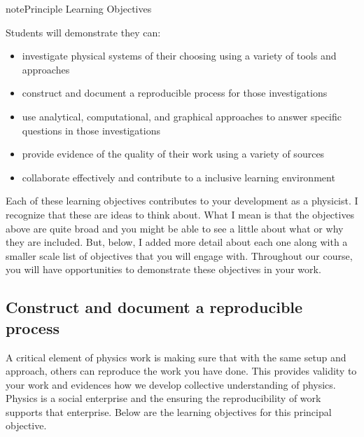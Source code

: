 \documentclass[letterpaper,10pt,english]{jupyterBook}
\begin{document}
\begin{sphinxadmonition}{note}{Principle Learning Objectives}

\sphinxAtStartPar
Students will demonstrate they can:
\begin{itemize}
\item {} 
\sphinxAtStartPar
investigate physical systems of their choosing using a variety of tools and approaches

\item {} 
\sphinxAtStartPar
construct and document a reproducible process for those investigations

\item {} 
\sphinxAtStartPar
use analytical, computational, and graphical approaches to answer specific questions in those investigations

\item {} 
\sphinxAtStartPar
provide evidence of the quality of their work using a variety of sources

\item {} 
\sphinxAtStartPar
collaborate effectively and contribute to a inclusive learning environment

\end{itemize}

\sphinxAtStartPar
Each of these learning objectives contributes to your development as a physicist. I recognize that these are  ideas to think about. What I mean is that the objectives above are quite broad and you might be able to see a little about what or why they are included. But, below, I added more detail about each one along with a smaller scale list of objectives that you will engage with. Throughout our course, you will have opportunities to demonstrate these objectives in your work. 
\end{sphinxadmonition}


\subsection{Construct and document a reproducible process}
\label{\detokenize{content/0_course/goals:construct-and-document-a-reproducible-process}}
\sphinxAtStartPar
A critical element of physics work is making sure that with the same setup and approach, others can reproduce the work you have done. This provides validity to your work and evidences how we develop collective understanding of physics. Physics is a social enterprise and the ensuring the reproducibility of work supports that enterprise. Below are the learning objectives for this principal objective.
\end{document}
